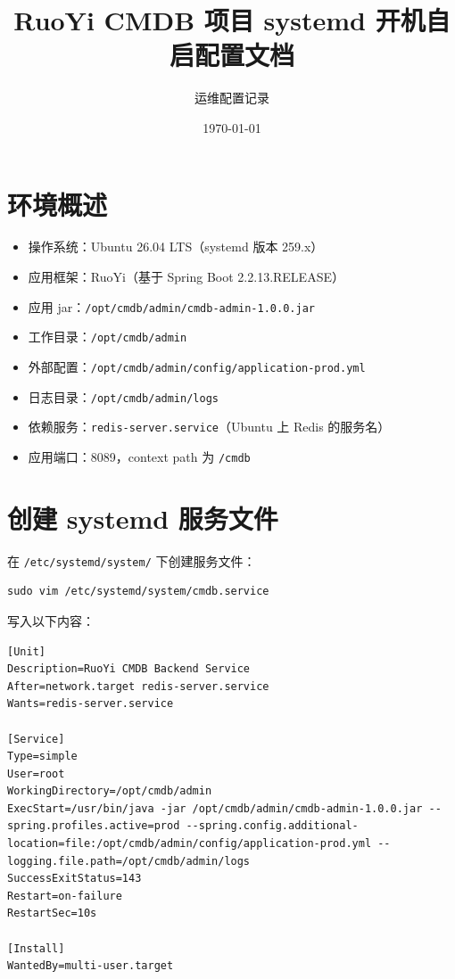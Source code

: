 \documentclass[12pt,a4paper]{ctexart}
\title{RuoYi CMDB 项目 systemd 开机自启配置文档}
\author{运维配置记录}
\date{\today}
\begin{document}
\maketitle

\tableofcontents
\newpage

\section{环境概述}

\begin{itemize}[leftmargin=2em]
  \item 操作系统：Ubuntu 26.04 LTS（systemd 版本 259.x）
  \item 应用框架：RuoYi（基于 Spring Boot 2.2.13.RELEASE）
  \item 应用 jar：\texttt{/opt/cmdb/admin/cmdb-admin-1.0.0.jar}
  \item 工作目录：\texttt{/opt/cmdb/admin}
  \item 外部配置：\texttt{/opt/cmdb/admin/config/application-prod.yml}
  \item 日志目录：\texttt{/opt/cmdb/admin/logs}
  \item 依赖服务：\texttt{redis-server.service}（Ubuntu 上 Redis 的服务名）
  \item 应用端口：8089，context path 为 \texttt{/cmdb}
\end{itemize}

\section{创建 systemd 服务文件}

在 \texttt{/etc/systemd/system/} 下创建服务文件：

\begin{lstlisting}[style=shell]
sudo vim /etc/systemd/system/cmdb.service
\end{lstlisting}

写入以下内容：

\begin{lstlisting}[style=ini]
[Unit]
Description=RuoYi CMDB Backend Service
After=network.target redis-server.service
Wants=redis-server.service

[Service]
Type=simple
User=root
WorkingDirectory=/opt/cmdb/admin
ExecStart=/usr/bin/java -jar /opt/cmdb/admin/cmdb-admin-1.0.0.jar --spring.profiles.active=prod --spring.config.additional-location=file:/opt/cmdb/admin/config/application-prod.yml --logging.file.path=/opt/cmdb/admin/logs
SuccessExitStatus=143
Restart=on-failure
RestartSec=10s

[Install]
WantedBy=multi-user.target
\end{lstlisting}
\end{document}
